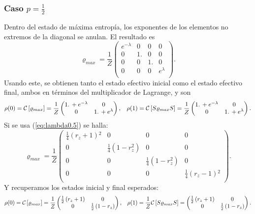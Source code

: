 \subsubsection{Caso $p=\frac{1}{2}$}
Dentro del estado de máxima entropía, los exponentes de los elementos no extremos de la diagonal se anulan. El resultado es
\begin{equation}
\varrho_{max}=\frac{1}{Z}
\begin{pmatrix}
 e^{-\lambda } & 0 & 0 & 0 \\
 0 & 1. & 0 & 0 \\
 0 & 0 & 1. & 0 \\
 0 & 0 & 0 & e^{\lambda } \\
\end{pmatrix}.
\end{equation}
Usando este, se obtienen tanto el estado efectivo inicial como el estado efectivo final, ambos en términos del multiplicador de Lagrange, y son
\begin{align}
\rho(0)=\mathcal{C}\left[\varrho_{max}\right]=\frac{1}{Z}
\begin{pmatrix}
 1.\, +e^{-\lambda } & 0 \\
 0 & 1.\, +e^{\lambda } \\
\end{pmatrix}, && \rho(1)=\mathcal{C}\left[S\varrho_{max} S\right]=\frac{1}{Z}
\begin{pmatrix}
 1.\, +e^{-\lambda } & 0 \\
 0 & 1.\, +e^{\lambda } \\
\end{pmatrix}.
\end{align}
Si se usa (\ref{eq:lambda0.5}) se halla:
\begin{equation}
\varrho_{max}=\frac{1}{Z}
\begin{pmatrix}
 \frac{1}{4} \left(r_z+1\right){}^2 & 0 & 0 & 0 \\
 0 & \frac{1}{4} \left(1-r_z^2\right) & 0 & 0 \\
 0 & 0 & \frac{1}{4} \left(1-r_z^2\right) & 0 \\
 0 & 0 & 0 & \frac{1}{4} \left(r_z-1\right){}^2 \\
\end{pmatrix}.
\end{equation}
Y recuperamos los estados inicial y final esperados:
\begin{align}
\rho(0)=\mathcal{C}\left[\varrho_{max}\right]=\frac{1}{Z}\begin{pmatrix}
 \frac{1}{2} \left(r_z+1\right) & 0 \\
 0 & \frac{1}{2} \left(1-r_z\right) \\
\end{pmatrix}, && \rho(1)=\frac{1}{Z}\mathcal{C}\left[S\varrho_{max} S\right]=
\begin{pmatrix}
 \frac{1}{2} \left(r_z+1\right) & 0 \\
 0 & \frac{1}{2} \left(1-r_z\right) \\
\end{pmatrix}.
\end{align}
\newpage

